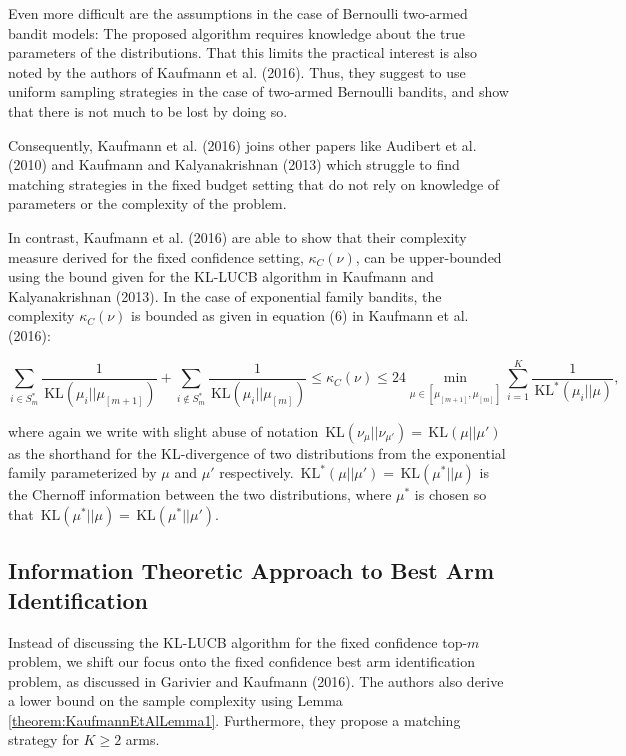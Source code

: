 \documentclass[11pt,]{article}
\newcommand{\KL}{\,\text{KL}}
\begin{document}
Even more difficult are the assumptions in the case of Bernoulli
two-armed bandit models: The proposed algorithm requires knowledge about
the true parameters of the distributions. That this limits the practical
interest is also noted by the authors of Kaufmann et al. (2016). Thus,
they suggest to use uniform sampling strategies in the case of two-armed
Bernoulli bandits, and show that there is not much to be lost by doing
so.

Consequently, Kaufmann et al. (2016) joins other papers like Audibert et
al. (2010) and Kaufmann and Kalyanakrishnan (2013) which struggle to
find matching strategies in the fixed budget setting that do not rely on
knowledge of parameters or the complexity of the problem.

In contrast, Kaufmann et al. (2016) are able to show that their
complexity measure derived for the fixed confidence setting,
\(\kappa_C(\nu)\), can be upper-bounded using the bound given for the
KL-LUCB algorithm in Kaufmann and Kalyanakrishnan (2013). In the case of
exponential family bandits, the complexity \(\kappa_C(\nu)\) is bounded
as given in equation (6) in Kaufmann et al. (2016):

\begin{equation*}
\sum_{i \in S^*_m} \frac{1}{\KL(\mu_i || \mu_{[m+1]})} + \sum_{i \notin S^*_m} \frac{1}{\KL(\mu_i || \mu_{[m]})} \leq \kappa_C(\nu) \leq 24 \min_{\mu \in [\mu_{[m+1]},\mu_{[m]}]} \sum_{i=1}^{K} \frac{1}{\KL^*(\mu_i || \mu)},
\end{equation*}

where again we write with slight abuse of notation
\(\KL(\nu_{\mu}|| \nu_{\mu'}) = \KL(\mu || \mu')\) as the shorthand for
the KL-divergence of two distributions from the exponential family
parameterized by \(\mu\) and \(\mu'\) respectively.
\(\KL^*(\mu || \mu') = \KL(\mu^* || \mu)\) is the Chernoff information
between the two distributions, where \(\mu^*\) is chosen so that
\(\KL(\mu^* || \mu) = \KL(\mu^* || \mu')\).

\subsection{\texorpdfstring{Information Theoretic Approach to Best Arm
Identification
\label{sec:OptimalBestArmIdentification}}{Information Theoretic Approach to Best Arm Identification }}\label{information-theoretic-approach-to-best-arm-identification}

Instead of discussing the KL-LUCB algorithm for the fixed confidence
top-\(m\) problem, we shift our focus onto the fixed confidence best arm
identification problem, as discussed in Garivier and Kaufmann (2016).
The authors also derive a lower bound on the sample complexity using
Lemma \autoref{theorem:KaufmannEtAlLemma1}. Furthermore, they propose a
matching strategy for \(K \geq 2\) arms.
\end{document}
